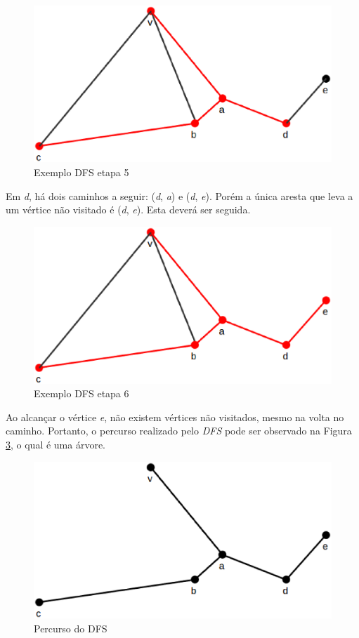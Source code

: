 \begin{figure}[!h]
	\centering
	\includegraphics[scale=0.25]{figuras/capitulo2/dfs/dfs5.eps}
	\caption{Exemplo DFS etapa 5}
	\label{dfs5}
\end{figure}

Em \textit{d}, há dois caminhos a seguir: (\textit{d}, \textit{a}) e (\textit{d}, \textit{e}). Porém a única aresta que leva a um vértice não visitado é (\textit{d}, \textit{e}). Esta deverá ser seguida.

\begin{figure}[!h]
	\centering
	\includegraphics[scale=0.25]{figuras/capitulo2/dfs/dfs6.eps}
	\caption{Exemplo DFS etapa 6}
	\label{dfs6}
\end{figure}

Ao alcançar o vértice \textit{e}, não existem vértices não visitados, mesmo na volta no caminho. Portanto, o percurso realizado pelo \textit{DFS} pode ser observado na Figura \ref{dfs_percurso}, o qual é uma árvore.

\begin{figure}[!h]
	\centering
	\includegraphics[scale=0.25]{figuras/capitulo2/dfs/dfs_percurso.eps}
	\caption{Percurso do DFS}
	\label{dfs_percurso}
\end{figure}

